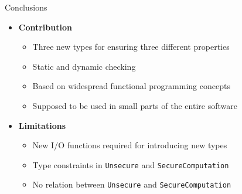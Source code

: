 \begin{frame}{Conclusions}
	\begin{itemize}
		\item \textbf{Contribution}
		\begin{itemize}
			\item Three new types for ensuring three different properties
			\item Static and dynamic checking
			\item Based on widespread functional programming concepts
			\item Supposed to be used in small parts of the entire software
		\end{itemize}
		\vspace{0.5cm}
		\item<2-> \textbf{Limitations}
			\begin{itemize}
				\item New I/O functions required for introducing new types
				\item Type constraints in \texttt{Unsecure} and \texttt{SecureComputation}
				\item No relation between \texttt{Unsecure} and \texttt{SecureComputation}
			\end{itemize}
	\end{itemize}
\end{frame}